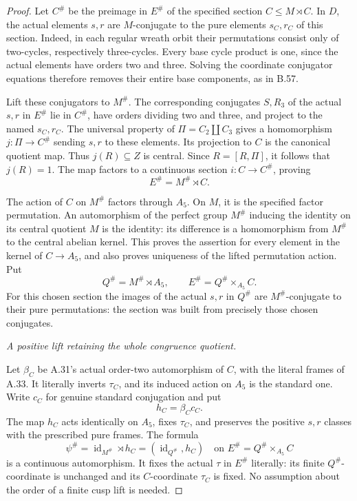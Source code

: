 \begin{proof}
Let \(C^\#\) be the preimage in \(E^\#\) of
the specified section \(C\leq M\rtimes C\).
In \(D\), the actual elements \(s,r\) are
\(M\)-conjugate to the pure elements
\(s_C,r_C\) of this section. Indeed, in each
regular wreath orbit their permutations consist
only of two-cycles, respectively three-cycles.
Every base cycle product is one, since the actual
elements have orders two and three. Solving the
coordinate conjugator equations therefore removes
their entire base components, as in B.57.

Lift these conjugators to \(M^\#\). The
corresponding conjugates \(S,R_3\) of the actual
\(s,r\) in \(E^\#\) lie in \(C^\#\), have
orders dividing two and three, and project to
the named \(s_C,r_C\). The universal property
of \(\Pi=C_2\amalg C_3\) gives a homomorphism
\(j:\Pi\to C^\#\) sending \(s,r\) to these
elements. Its projection to \(C\) is the
canonical quotient map. Thus \(j(R)\subseteq Z\)
is central. Since \(R=[R,\Pi]\), it follows
that \(j(R)=1\). The map factors to a continuous
section \(i:C\to C^\#\), proving
\[
                         E^\#=M^\#\rtimes C.
 \tag{A.40.4}
\]

The action of \(C\) on \(M^\#\) factors
through \(A_5\). On \(M\), it is the specified
factor permutation. An automorphism of the
perfect group \(M^\#\) inducing the identity
on its central quotient \(M\) is the identity:
its difference is a homomorphism from \(M^\#\)
to the central abelian kernel. This proves the
assertion for every element in the kernel of
\(C\to A_5\), and also proves uniqueness of the
lifted permutation action. Put
\[
 Q^\#=M^\#\rtimes A_5,
 \qquad E^\#=Q^\#\times_{A_5}C.
 \tag{A.40.5}
\]
For this chosen section the images of the actual
\(s,r\) in \(Q^\#\) are \(M^\#\)-conjugate
to their pure permutations: the section was built
from precisely those chosen conjugates.

\emph{A positive lift retaining the whole congruence quotient.}\par
Let \(\beta_C\) be A.31's actual order-two
automorphism of \(C\), with the literal frames
of A.33. It literally inverts \(\tau_C\), and
its induced action on \(A_5\) is the standard
one. Write \(c_C\) for genuine standard
conjugation and put
\[
                          h_C=\beta_Cc_C.
\]
The map \(h_C\) acts identically on \(A_5\),
fixes \(\tau_C\), and preserves the positive
\(s,r\) classes with the prescribed pure frames.
The formula
\[
 \psi^\#=\operatorname{id}_{M^\#}\rtimes h_C
        =(\operatorname{id}_{Q^\#},h_C)
       \quad\text{on }E^\#=Q^\#\times_{A_5}C
 \tag{A.40.6}
\]
is a continuous automorphism. It fixes the actual
\(\tau\) in \(E^\#\) literally: its finite
\(Q^\#\)-coordinate is unchanged and its
\(C\)-coordinate \(\tau_C\) is fixed. No
assumption about the order of a finite cusp lift
is needed.


\end{proof}
